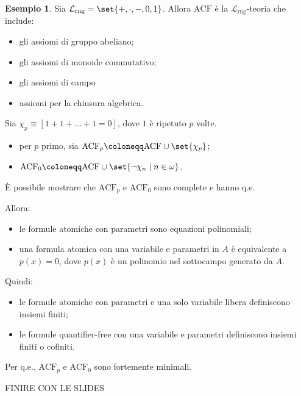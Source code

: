 \documentclass[10pt]{article}
\newcommand{\1}{\mathds{1}}
\theoremstyle{definition}%
\newtheorem{esempio}[thm]{Esempio}
\theoremstyle{plain}
\theoremstyle{remark}
\begin{document}
\begin{esempio}
Sia \(\mathcal{L}_{\text{rng}} = \set{+,\cdot,-,0,1}\). Allora \({\mathrm{ACF}}\) è la \(\mathcal{L}_{\text{rng}}\)-teoria che include:
\begin{itemize}
\item gli assiomi di gruppo abeliano;
\item gli assiomi di monoide commutativo;
\item gli assiomi di campo
\item assiomi per la chiusura algebrica.
\end{itemize}

Sia \(\chi_{p}\equiv [1+1+\dots+1=0]\), dove \(1\) è ripetuto \(p\) volte.
\begin{itemize}
\item per \(p\) primo, sia \(\mathrm{ACF}_{p}\coloneqq\mathrm{ACF}\cup\set{\chi_{p}}\);
\item \(\mathrm{ACF}_{0} \coloneqq \mathrm{ACF}\cup\set{\lnot\chi_{n}\mid n \in \omega}\).
\end{itemize}

È possibile mostrare che \(\mathrm{ACF}_{p}\) e \(\mathrm{ACF}_{0}\) sono complete e hanno q.e.

Allora:
\begin{itemize}
\item le formule atomiche con parametri sono equazioni polinomiali;
\item una formula atomica con una variabile e parametri in \(A\) è equivalente a \(p(x)=0\), dove \(p(x)\) è un polinomio nel sottocampo generato da \(A\).
\end{itemize}
Quindi:
\begin{itemize}
\item le formule atomiche con parametri e una solo variabile libera definiscono insiemi finiti;
\item le formule quantifier-free con una variabile e parametri definiscono insiemi finiti o cofiniti.
\end{itemize}

Per q.e., \(\mathrm{ACF}_{p}\) e \(\mathrm{ACF}_{0}\) sono fortemente minimali.
\end{esempio}
FINIRE CON LE SLIDES
\end{document}
